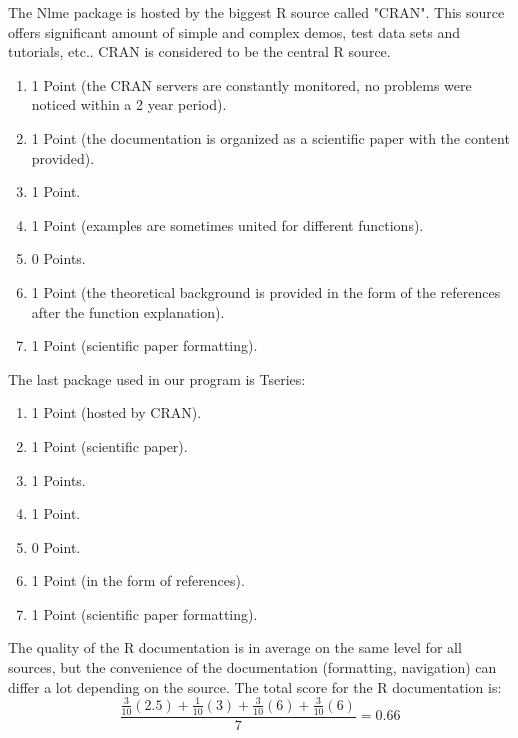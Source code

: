 \documentclass{article}
\begin{document}
The Nlme package is hosted by the biggest R source called "CRAN". This source offers significant amount of simple and complex demos, test data sets and tutorials, etc.. CRAN is considered to be the central R source.
\begin{enumerate}
    \item 1 Point (the CRAN servers are constantly monitored, no problems were noticed within a 2 year period).
    \item 1 Point (the documentation is organized as a scientific paper with the content provided).
    \item 1 Point.
    \item 1 Point (examples are sometimes united for different functions).
    \item 0 Points.
    \item 1 Point (the theoretical background is provided in the form of the references after the function explanation).
    \item 1 Point (scientific paper formatting).
\end{enumerate}
The last package used in our program is Tseries:
\begin{enumerate}
    \item 1 Point (hosted by CRAN).
    \item 1 Point (scientific paper).
    \item 1 Points.
    \item 1 Point.
    \item 0 Point.
    \item 1 Point (in the form of references).
    \item 1 Point (scientific paper formatting).
\end{enumerate}
The quality of the R documentation is in average on the same level for all sources, but the convenience of the documentation (formatting, navigation) can differ a lot depending on the source. The total score for the R documentation is:
\[ \frac{\frac{3}{10}(2.5)+\frac{1}{10}(3)+\frac{3}{10}(6)+\frac{3}{10}(6)}{7}= 0.66 \] 
\end{document}
